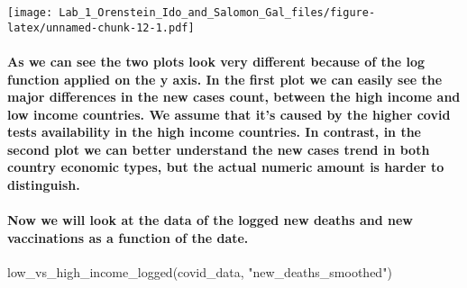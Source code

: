 \documentclass[
]{article}
\newenvironment{Shaded}{\begin{snugshade}}{\end{snugshade}}
\newcommand{\FunctionTok}[1]{\textcolor[rgb]{0.00,0.00,0.00}{#1}}
\newcommand{\NormalTok}[1]{#1}
\newcommand{\StringTok}[1]{\textcolor[rgb]{0.31,0.60,0.02}{#1}}
\begin{document}
\texttt{[image: Lab\_1\_Orenstein\_Ido\_and\_Salomon\_Gal\_files/figure-latex/unnamed-chunk-12-1.pdf]}

\hypertarget{as-we-can-see-the-two-plots-look-very-different-because-of-the-log-function-applied-on-the-y-axis.-in-the-first-plot-we-can-easily-see-the-major-differences-in-the-new-cases-count-between-the-high-income-and-low-income-countries.-we-assume-that-its-caused-by-the-higher-covid-tests-availability-in-the-high-income-countries.-in-contrast-in-the-second-plot-we-can-better-understand-the-new-cases-trend-in-both-country-economic-types-but-the-actual-numeric-amount-is-harder-to-distinguish.}{%
\paragraph{As we can see the two plots look very different because of
the log function applied on the y axis. In the first plot we can easily
see the major differences in the new cases count, between the high
income and low income countries. We assume that it's caused by the
higher covid tests availability in the high income countries. In
contrast, in the second plot we can better understand the new cases
trend in both country economic types, but the actual numeric amount is
harder to
distinguish.}\label{as-we-can-see-the-two-plots-look-very-different-because-of-the-log-function-applied-on-the-y-axis.-in-the-first-plot-we-can-easily-see-the-major-differences-in-the-new-cases-count-between-the-high-income-and-low-income-countries.-we-assume-that-its-caused-by-the-higher-covid-tests-availability-in-the-high-income-countries.-in-contrast-in-the-second-plot-we-can-better-understand-the-new-cases-trend-in-both-country-economic-types-but-the-actual-numeric-amount-is-harder-to-distinguish.}}

\hypertarget{now-we-will-look-at-the-data-of-the-logged-new-deaths-and-new-vaccinations-as-a-function-of-the-date.}{%
\paragraph{Now we will look at the data of the logged new deaths and new
vaccinations as a function of the
date.}\label{now-we-will-look-at-the-data-of-the-logged-new-deaths-and-new-vaccinations-as-a-function-of-the-date.}}

\begin{Shaded}
\begin{Highlighting}[]
\FunctionTok{low\_vs\_high\_income\_logged}\NormalTok{(covid\_data, }\StringTok{"new\_deaths\_smoothed"}\NormalTok{)}
\end{Highlighting}
\end{Shaded}
\end{document}
